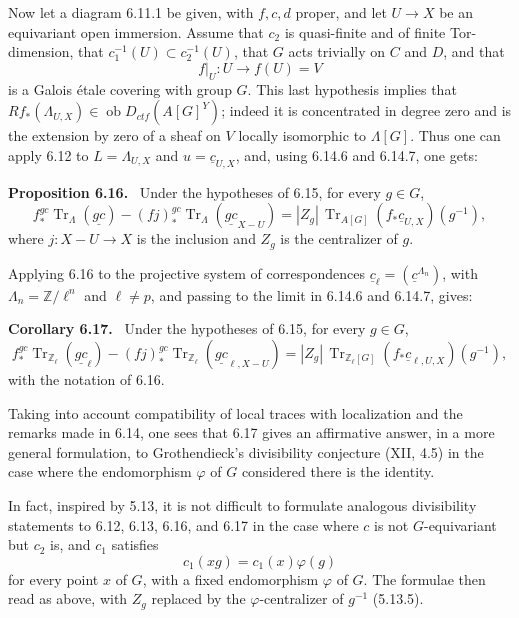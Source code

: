 \documentclass[12pt]{article}
\newcommand{\bZ}{\mathbb Z}
\newcommand{\Tr}{\operatorname{Tr}}
\newcommand{\ob}{\operatorname{ob}}
\newenvironment{statement}[1]{\par\medskip\noindent\textbf{#1.}\ }{\par\medskip}
\begin{document}
Now let a diagram 6.11.1 be given, with $f,c,d$ proper, and let
$U\to X$ be an equivariant open immersion. Assume that $c_2$ is quasi-finite and
of finite Tor-dimension, that $c_1^{-1}(U)\subset c_2^{-1}(U)$, that $G$ acts
trivially on $C$ and $D$, and that
\[
     f|_U:U\longrightarrow f(U)=V
\]
is a Galois étale covering with group $G$. This last hypothesis implies that
$Rf_*(\Lambda_{U,X})\in\ob D_{ctf}(A[G]^Y)$; indeed it is concentrated in degree
zero and is the extension by zero of a sheaf on $V$ locally isomorphic to
$\Lambda[G]$. Thus one can apply 6.12 to
$L=\Lambda_{U,X}$ and $u=\underline c_{U,X}$, and, using 6.14.6 and 6.14.7, one
gets:

\begin{statement}{Proposition 6.16}
Under the hypotheses of 6.15, for every $g\in G$,
\begin{equation}\tag{6.16.1}
 f_*^{gc}\Tr_\Lambda(\underline{gc})
 -(fj)_*^{gc}\Tr_\Lambda(\underline{gc}_{X-U})
 =|Z_g|\,\Tr_{A[G]}(f_*\underline c_{U,X})(g^{-1}),
\end{equation}
where $j:X-U\to X$ is the inclusion and $Z_g$ is the centralizer of $g$.
\end{statement}

Applying 6.16 to the projective system of correspondences
$\underline c_\ell=(\underline c^{\Lambda_n})$, with $\Lambda_n=\bZ/\ell^n$ and
$\ell\ne p$, and passing to the limit in 6.14.6 and 6.14.7, gives:

\begin{statement}{Corollary 6.17}
Under the hypotheses of 6.15, for every $g\in G$,
\begin{equation}\tag{6.17.1}
 f_*^{gc}\Tr_{\bZ_\ell}(\underline{gc}_\ell)
 -(fj)_*^{gc}\Tr_{\bZ_\ell}(\underline{gc}_{\ell,X-U})
 =|Z_g|\,\Tr_{\bZ_\ell[G]}(f_*\underline c_{\ell,U,X})(g^{-1}),
\end{equation}
with the notation of 6.16.
\end{statement}

Taking into account compatibility of local traces with localization and the remarks
made in 6.14, one sees that 6.17 gives an affirmative answer, in a more general
formulation, to Grothendieck's divisibility conjecture (XII, 4.5) in the case where
the endomorphism $\varphi$ of $G$ considered there is the identity.

In fact, inspired by 5.13, it is not difficult to formulate analogous divisibility
statements to 6.12, 6.13, 6.16, and 6.17 in the case where $c$ is not
$G$-equivariant but $c_2$ is, and $c_1$ satisfies
\[
       c_1(xg)=c_1(x)\varphi(g)
\]
for every point $x$ of $G$, with a fixed endomorphism $\varphi$ of $G$. The
formulae then read as above, with $Z_g$ replaced by the $\varphi$-centralizer of
$g^{-1}$ (5.13.5).
\end{document}
